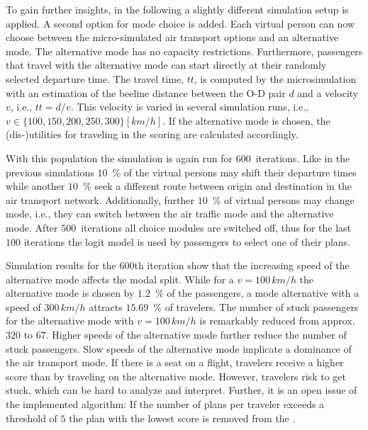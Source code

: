 To gain further insights, in the following a slightly different simulation setup is applied. 
A second option for mode choice is added. 
Each virtual person can now choose between the micro-simulated air transport options and an alternative mode. 
The alternative mode has no capacity restrictions. 
Furthermore, passengers that travel with the alternative mode can start directly at their randomly selected departure time. 
The travel time, $tt$, is computed by the microsimulation with an estimation of the beeline distance between the O-D pair $d$ and a velocity $v$, i.e., $tt = d / v$.  
This velocity is varied in several simulation runs, i.e., $v \in \{100, 150, 200, 250, 300 \} [km/h]$. 
If the alternative mode is chosen, the (dis-)utilities for traveling in the scoring are calculated accordingly.  

With this population the simulation is again run for $600$~iterations. 
Like in the previous simulations $10$~\% of the virtual persons may shift their departure times while another $10$~\% seek a different route between origin and destination in the air transport network. 
Additionally, further $10$~\% of virtual persons may change mode, i.e., they can switch between the air traffic mode and the alternative mode. 
After $500$~iterations all choice modules are switched off, thus for the last $100$ iterations the logit model is used by passengers to select one of their plans. 

Simulation results for the 600th iteration show that the 
increasing speed of the alternative mode affects the modal split. %
While for a $v = 100 \, km/h$ the alternative mode is chosen by $1.2$~\% of the passengers, a mode alternative with a speed of $300 \, km/h$ attracts $15.69$~\% of travelers. 
The number of stuck passengers for the alternative mode with $v = 100 \, km/h$ is remarkably reduced from approx.~$320$ to $67$. 
Higher speeds of the alternative mode further reduce the number of stuck passengers. 
Slow speeds of the alternative mode implicate a dominance of the air transport mode. 
If there is a seat on a flight, travelers receive a higher score than by traveling on the alternative mode. 
However, travelers risk to get stuck, which can be hard to analyze and interpret. 
Further, it is an open issue of the implemented algorithm: If the number of plans per traveler exceeds a threshold of $5$ the plan with the lowest score is removed from the . 


